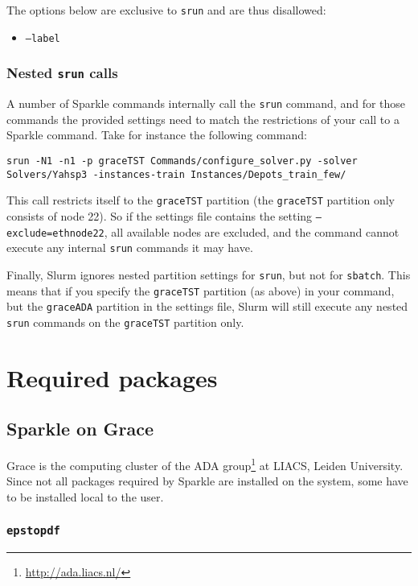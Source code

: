 \documentclass{article}
\begin{document}
The options below are exclusive to \texttt{srun} and are thus disallowed:

\begin{itemize}
  \setlength{\itemsep}{0pt}
  \item[] \texttt{--label}
\end{itemize}

\subsubsection{Nested \texttt{srun} calls}
A number of Sparkle commands internally call the \texttt{srun} command, and for those commands the provided settings need to match the restrictions of your call to a Sparkle command. Take for instance the following command:

\begin{lstlisting}[breaklines]
srun -N1 -n1 -p graceTST Commands/configure_solver.py -solver Solvers/Yahsp3 -instances-train Instances/Depots_train_few/
\end{lstlisting}

This call restricts itself to the \texttt{graceTST} partition (the \texttt{graceTST} partition only consists of node 22). So if the settings file contains the setting \texttt{--exclude=ethnode22}, all available nodes are excluded, and the command cannot execute any internal \texttt{srun} commands it may have.

Finally, Slurm ignores nested partition settings for \texttt{srun}, but not for \texttt{sbatch}. This means that if you specify the \texttt{graceTST} partition (as above) in your command, but the \texttt{graceADA} partition in the settings file, Slurm will still execute any nested \texttt{srun} commands on the \texttt{graceTST} partition only.

\section{Required packages}

\subsection{Sparkle on Grace}

Grace is the computing cluster of the ADA group\footnote{\url{http://ada.liacs.nl/}} at LIACS, Leiden University. Since not all packages required by Sparkle are installed on the system, some have to be installed local to the user.

\subsubsection{\texttt{epstopdf}}
\label{package:epstopdf}
\end{document}
